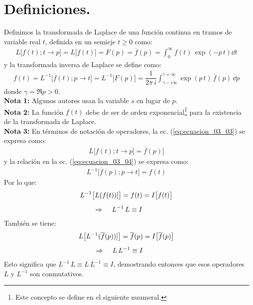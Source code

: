 \section{Definiciones.}

Definimos la transformada de Laplace de una función continua en tramos de variable real $t$, definida en un semieje $t \geq 0$ como:
\begin{align}
L \big[f(t); t \to p\big] = L \big[f(t)\big] = F(p) = \overline{f}(p) = \int_{0}^{\infty} f(t) \, \exp(-p \, t) \dd{t}
\label{eq:ecuacion_03_03}
\end{align}
y la transformada inversa de Laplace se define como:
\begin{align}
f(t) = L^{-1} \big[\overline{f}(t); p \to t\big] = L^{-1} \big[F(p)\big] = \dfrac{1}{2 \pi \, i} \int_{\gamma-i \infty}^{\gamma+\infty} \exp(p \, t) \, \overline{f} (p) \, \dd{p}
\label{eq:ecuacion_03_04}
\end{align}
donde $\gamma = \Re{p} > 0$.
\\[1em]
\noindent \textbf{Nota 1: } Algunos autores usan la variable $s$ en lugar de $p$.
\\
\textbf{Nota 2: } La función $f(t)$ debe de ser de orden exponencial\footnote{Este concepto se define en el siguiente nuumeral.} para la existencia de la transformada de Laplace.
\\
\textbf{Nota 3: } En términos de notación de operadores, la ec. (\ref{eq:ecuacion_03_03}) se expresa como:
\begin{align}
L \big[ f(t); t \to p] = \overline{f} (p) \big]
\label{eq:ecuacion_03_05}
\end{align}
y la relación en la ec. (\ref{eq:ecuacion_03_04}) se expresa como:
\begin{align}
L^{-1} \big[\overline{f}(p); p \to t \big] = f (t)
\label{eq:ecuacion_03_06}
\end{align}
Por lo que:
\begin{align*}
L^{-1} \big[L(f(t))]\big] = f(t) &= I \big[f(t)\big] \\[0.5em]
\Rightarrow \hspace{0.4cm} L^{-1} \, L \equiv I
\end{align*}
También se tiene:
\begin{align*}
L \big[L^{-1} (\overline{f}(p))]\big] = \overline{f}(p) &= I \big[\overline{f}(p)\big] \\[0.5em]
\Rightarrow \hspace{0.4cm} L \, L^{-1} \equiv I
\end{align*}
Esto significa que $L^{-1} \, L \equiv L \, L^{-1} \equiv I$, demostrando entonces que esos operadores $L$ y $L^{-1}$ son conmutativos.

